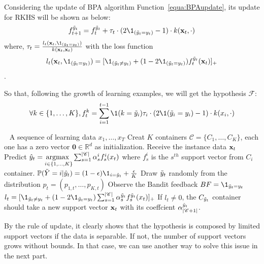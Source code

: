 Considering the update of BPA algorithm Function~\ref{equa:BPAupdate}, its update for RKHS will be shown as below:
\[f^{\ty}_{t+1} = f^{\ty}_t + \tau_t\cdot(2\1_{(\ty=y_t)}-1)\cdot k(\xt,\cdot)\]where, $\tau_t = \frac{l_t(\xt,\1_{(\ty = y_t)})}{k(\xt,\xt)}$ with the loss function
\[l_t(\xt,\1_{(\ty=y_t)}) = [\1_{(\ty\neq y_t)} + (1-2\1_{(\ty = y_t)})f_t^{\ty}(\xt)]_+\].

So that, following the growth of learning examples, we will get the hypothesis $\mathscr{F}$:
\begin{equation}
\label{equa:kbpaupdate}
\forall k\in\{1,\dots,K\}, f_t^k = \sum_{i=1}^{t-1}\1(k=\tilde{y}_i)\tau_i\cdot(2\1(\tilde{y}_i=y_i)-1)\cdot k(x_i,\cdot)
\end{equation}

\begin{algo}
\label{algo:KBPA}
\begin{algorithmic}
\STATE	$\ \ $
\STATE	A sequence of learning data $x_1,\dots, x_T$
\STATE	Creat $K$ containers $\mathscr{C} = \{C_1,\dots,C_K\}$, each one has a zero vector $\mathbf{0} \in \mathbb{R}^d$ as initialization.
	\STATE	Receive the instance data $\mathbf{x}_t$
	\STATE	Predict $\hat{y}_t = \underset{i\in\{1,\dots,K\}}{\text{argmax }}\sum_{s=1}^{|\mathscr{C}|} \alpha_s^i f_{s}^i(x_t)$ where $f_{s}^i$ is the $s^{th}$ support vector from $C_i$ container.
		\STATE	$\mathbb{P}(\tilde{Y} =  i | \hy) = (1-\epsilon)\1_{i=\hy} +\frac{\epsilon}{K} $
	\ENDFOR	
	\STATE	Draw $\tilde{y}_t$ randomly from the distribution $p_t = (p_{1,t},\dots,p_{K,t})$
	\STATE	Observe the Bandit feedback  $BF = \1_{\ty = y_t}$
	\STATE	$l_t = [\1_{\ty \neq y_t} + (1-2\1_{\ty = y_t}) \sum_{s=1}^{|\mathscr{C}|}\alpha_s^{\ty} f_s^{\ty}(x_t)]_+$
	\STATE	If $l_t \neq 0$, the $C_{\tilde{y}_t}$ container should take a new support vector $\mathbf{x}_t$ with its coeffcient $\alpha_{|\mathscr{C}+1|}^{\tilde{y}_t}$.
\ENDFOR
\end{algorithmic}
\end{algo}

By the rule of update, it clearly shows that the hypothesis is composed by limited support vectors if the data is separable. If not, the number of support vectors grows without bounds. In that case, we can use another way to solve this issue in the next part. 

